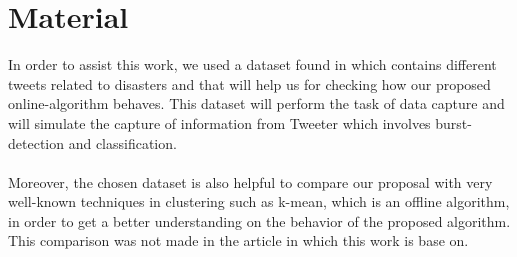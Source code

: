 \documentclass{article}
\begin{document}
\section{Material}
In order to assist this work, we used a dataset found in \cite{dataset} which contains different tweets related to disasters and that will help us for checking how our proposed online-algorithm behaves. This dataset will perform the task of data capture and will simulate the capture of information from Tweeter which involves burst-detection and classification.
\\
\\
Moreover, the chosen dataset is also helpful to compare our proposal with very well-known techniques in clustering such as k-mean, which is an offline algorithm, in order to get a better understanding on the behavior of the proposed algorithm. This comparison was not made in the article in which this work is base on.
\end{document}
